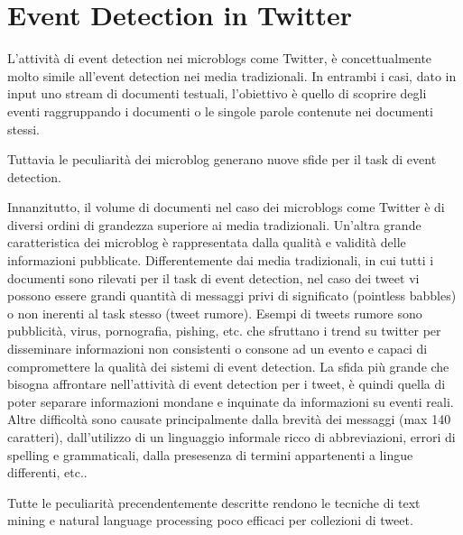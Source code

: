 \section{Event Detection in Twitter}
L'attività di event detection nei microblogs come Twitter, è concettualmente molto simile all'event detection nei media tradizionali. In entrambi i casi, dato in input uno stream di documenti testuali, l'obiettivo è quello di scoprire degli eventi raggruppando i documenti o le singole parole contenute nei documenti stessi. 

Tuttavia le peculiarità dei microblog generano  nuove sfide per il task di event detection.

Innanzitutto, il volume di documenti nel caso dei microblogs come Twitter  è di diversi ordini di grandezza superiore ai media tradizionali. Un'altra grande caratteristica dei microblog è rappresentata dalla qualità e validità delle informazioni pubblicate. Differentemente dai media tradizionali, in cui tutti i documenti sono rilevati per il task di event detection, nel caso dei tweet vi possono essere grandi quantità di messaggi privi di significato (pointless babbles) \cite{DBLP:conf/icwsm/HurlockW11} o non inerenti al task stesso \cite{Castillo:2011:ICT:1963405.1963500} (tweet rumore). Esempi di tweets rumore sono pubblicità, virus, pornografia, pishing, etc. \cite{DBLP:conf/icwsm/LeeEC11} che sfruttano i trend su twitter per disseminare informazioni non consistenti o consone ad un evento e capaci di compromettere la qualità dei sistemi di event detection.
La sfida più grande che bisogna affrontare nell'attività di event detection per i tweet, è quindi quella di poter separare informazioni mondane e inquinate da informazioni su eventi reali. Altre difficoltà sono causate principalmente dalla brevità dei messaggi (max 140 caratteri), dall'utilizzo di un linguaggio informale ricco di abbreviazioni, errori di spelling e grammaticali, dalla presesenza di termini appartenenti a lingue differenti, etc..

Tutte le peculiarità precendentemente descritte rendono le tecniche di text mining e natural language processing poco efficaci per collezioni di tweet.

